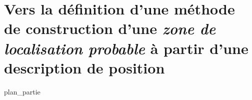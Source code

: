 \part{Vers la définition d'une méthode de construction d'une
  \emph{zone de localisation probable} à partir d'une description de
  position}
\label{part:02}
{plan_partie}

